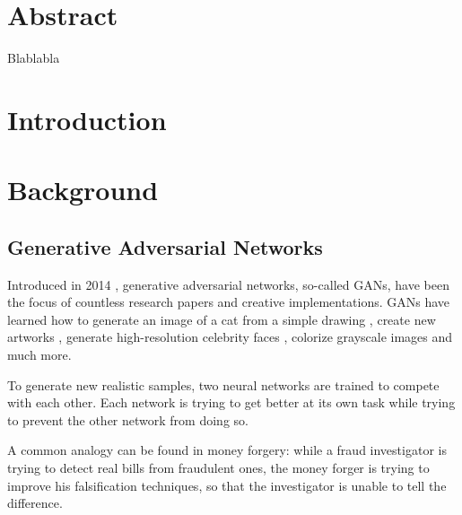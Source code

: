 \documentclass[12pt]{report}
\begin{document}


\chapter*{Abstract}
Blablabla
\clearpage

\pagestyle{plain}
\tableofcontents
\clearpage


\pagestyle{fancy}
\fancyhf{}
\lhead{\slshape\nouppercase{\rightmark}}
\rhead{ \thepage}
\renewcommand{\headrulewidth}{.5pt}
\chapter{Introduction}


\newpage
\chapter{Background}
\section{Generative Adversarial Networks}

Introduced in 2014 \cite{goodfellow_generative_2014}, generative adversarial  networks, so-called GANs, have been the focus of countless research papers and creative implementations. GANs have learned how to generate an image of a cat from a simple drawing \cite{hesse_image--image_nodate}, create new artworks \cite{rkjones4_gangogh_2018}, generate high-resolution celebrity faces \cite{karras_progressive_2017}, colorize grayscale images and much more.

To generate new realistic samples, two neural networks are trained to compete with each other. Each network is trying to get better at its own task while trying to prevent the other network from doing so. 

A common analogy can be found in money forgery: while a fraud investigator is trying to detect real bills from fraudulent ones, the money forger is trying to improve his falsification techniques, so that the investigator is unable to tell the difference.
\end{document}

